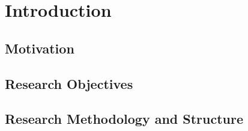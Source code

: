 \documentclass[12pt,a4paper,oneside,notitlepage,USenglish]{scrreprt}
\begin{document}





			\chapter{Introduction}

			\section{Motivation}
			
			
			
			\section{Research Objectives}

			\section{Research Methodology and Structure}


\end{document}
